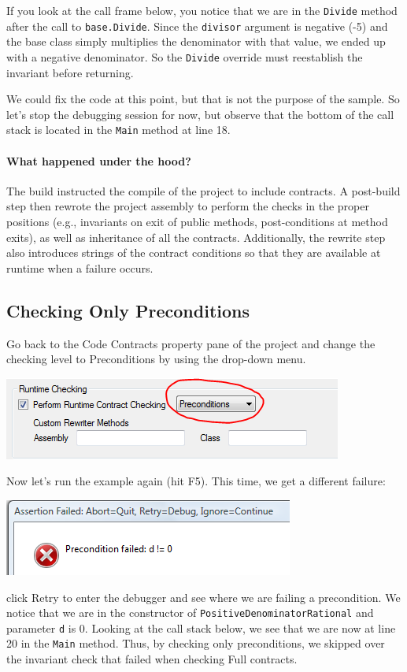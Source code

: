 \documentclass{article}
\newcommand{\code}[1]{\lstinline{#1}}
\begin{document}
If you look at the call frame below, you notice that we are in the
\code{Divide} method after the call to \code{base.Divide}. Since the
\code{divisor} argument is negative (-5) and the base class simply
multiplies the denominator with that value, we ended up with a
negative denominator. So the \code{Divide} override must reestablish
the invariant before returning.

We could fix the code at this point, but that is not the purpose of
the sample. So let's stop the debugging session for now, but observe
that the bottom of the call stack is located in the \code{Main} method
at line 18.

\paragraph{What happened under the hood?} The build instructed the compile
of the project to include contracts. A post-build step
then rewrote the project assembly to perform the checks in the proper
positions (e.g., invariants on exit of public methods, post-conditions
at method exits), as well as
inheritance of all the contracts. Additionally, the rewrite step also
introduces strings of the contract conditions so that they are
available at runtime when a failure occurs.

\subsection{Checking Only Preconditions}
Go back to the \textsf{Code Contracts} property pane of the project
and change the checking level to \textsf{Preconditions} by using the
drop-down menu.
\begin{center}
  \includegraphics[width=.7\columnwidth]{ex3.png}
\end{center}
Now let's run the example again (hit F5). This time, we get a
different failure:
\begin{center}
  \includegraphics[width=.7\columnwidth]{ex4.png}
\end{center}
click \textsf{Retry} to enter the debugger and see where we are
failing a precondition. We notice that we are in the constructor of
\code{PositiveDenominatorRational} and parameter \code{d} is
0. Looking at the call stack below, we see that we are now at line 20
in the \code{Main} method. Thus, by checking only preconditions, we
skipped over the invariant check that failed when checking
\textsf{Full} contracts.
\end{document}
